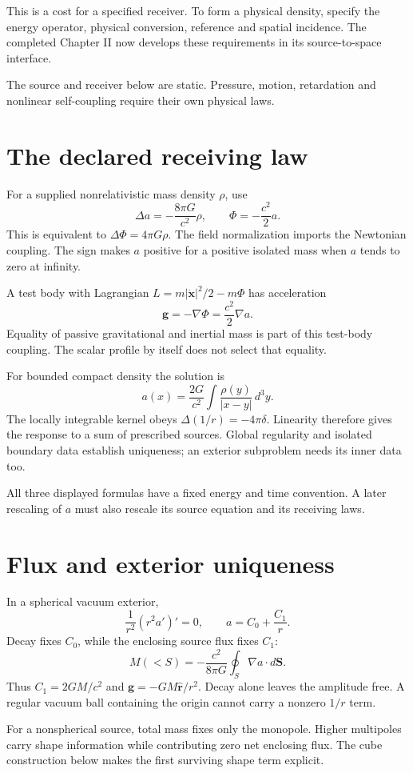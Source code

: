\documentclass[10pt,twocolumn,letterpaper]{article}
\begin{document}
This is a cost for a specified receiver. To form a physical density, specify the energy operator, physical conversion, reference and spatial incidence. The completed Chapter II now develops these requirements in its source-to-space interface.

The source and receiver below are static. Pressure, motion, retardation and nonlinear self-coupling require their own physical laws.

\section{The declared receiving law}
For a supplied nonrelativistic mass density $\rho$, use
\[
\Delta a=-\frac{8\pi G}{c^2}\rho,\qquad \Phi=-\frac{c^2}{2}a.
\]
This is equivalent to $\Delta\Phi=4\pi G\rho$. The field normalization imports the Newtonian coupling. The sign makes $a$ positive for a positive isolated mass when $a$ tends to zero at infinity.

A test body with Lagrangian $L=m|\dot{\mathbf x}|^2/2-m\Phi$ has acceleration
\[
\mathbf g=-\nabla\Phi=\frac{c^2}{2}\nabla a.
\]
Equality of passive gravitational and inertial mass is part of this test-body coupling. The scalar profile by itself does not select that equality.

For bounded compact density the solution is
\[
a(x)=\frac{2G}{c^2}\int\frac{\rho(y)}{|x-y|}\,d^3y.
\]
The locally integrable kernel obeys $\Delta(1/r)=-4\pi\delta$. Linearity therefore gives the response to a sum of prescribed sources. Global regularity and isolated boundary data establish uniqueness; an exterior subproblem needs its inner data too.

All three displayed formulas have a fixed energy and time convention. A later rescaling of $a$ must also rescale its source equation and its receiving laws.

\section{Flux and exterior uniqueness}
In a spherical vacuum exterior,
\[
\frac{1}{r^2}(r^2a')'=0,\qquad a=C_0+\frac{C_1}{r}.
\]
Decay fixes $C_0$, while the enclosing source flux fixes $C_1$:
\[
M(<S)=-\frac{c^2}{8\pi G}\oint_S\nabla a\cdot d\mathbf S.
\]
Thus $C_1=2GM/c^2$ and $\mathbf g=-GM\hat{\mathbf r}/r^2$. Decay alone leaves the amplitude free. A regular vacuum ball containing the origin cannot carry a nonzero $1/r$ term.

For a nonspherical source, total mass fixes only the monopole. Higher multipoles carry shape information while contributing zero net enclosing flux. The cube construction below makes the first surviving shape term explicit.
\end{document}
